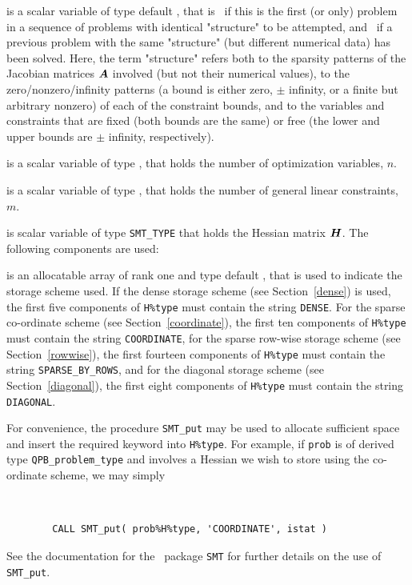\documentclass{galahad}
\newcommand{\packagename}{QPB}
\begin{document}
\begin{description}

 is a scalar variable of type default \logical, 
 that is \true\ if this is the first (or only) problem in a sequence of 
 problems with identical "structure" to be attempted, and \false\ if 
 a previous problem with the same "structure" (but different
 numerical data) has been solved. Here, the term "structure" refers both to 
 the sparsity patterns of the Jacobian matrices ${\bm{A}}$ involved 
 (but not their numerical values), to the zero/nonzero/infinity patterns 
 (a bound is either zero, $\pm$ infinity, or a finite but arbitrary 
 nonzero) of each of the constraint bounds, and to the variables and constraints
 that are fixed (both bounds are the same) or free (the lower and upper
 bounds are $\pm$ infinity, respectively).

 is a scalar variable of type \integer, 
 that holds the number of optimization variables, $n$.  
              
 is a scalar variable of type \integer, 
 that holds the number of general linear constraints, $m$.
              
 is scalar variable of type {\tt SMT\_TYPE} 
that holds the Hessian matrix ${\bm{H}}$. The following components
are used:

\begin{description}

 is an allocatable array of rank one and type default \character, that
is used to indicate the storage scheme used. If the dense storage scheme 
(see Section~\ref{dense}) is used, 
the first five components of {\tt H\%type} must contain the
string {\tt DENSE}.
For the sparse co-ordinate scheme (see Section~\ref{coordinate}), 
the first ten components of {\tt H\%type} must contain the
string {\tt COORDINATE},  
for the sparse row-wise storage scheme (see Section~\ref{rowwise}),
the first fourteen components of {\tt H\%type} must contain the
string {\tt SPARSE\_BY\_ROWS},
and for the diagonal storage scheme (see Section~\ref{diagonal}),
the first eight components of {\tt H\%type} must contain the
string {\tt DIAGONAL}.

For convenience, the procedure {\tt SMT\_put} 
may be used to allocate sufficient space and insert the required keyword
into {\tt H\%type}.
For example, if {\tt prob} is of derived type {\tt \packagename\_problem\_type}
and involves a Hessian we wish to store using the co-ordinate scheme,
we may simply
{\tt 
\begin{verbatim}
        CALL SMT_put( prob%H%type, 'COORDINATE', istat )
\end{verbatim}
}
\noindent
See the documentation for the \galahad\ package {\tt SMT} 
for further details on the use of {\tt SMT\_put}.


\end{description}
\end{description}
\end{document}
